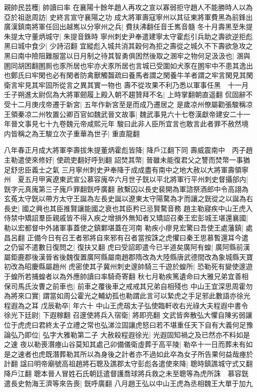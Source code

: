 親帥民芸穫|{
	帥讀曰率}
在襄陽十餘年趙人再攻之宣以寡弱拒守趙人不能勝時人以為亞於祖逖周訪|{
	史終言宣守襄陽之功}
成大將軍壽寇寧州以其征東將軍費黑為前鋒出廣漢鎮南將軍任回出越嶲以分寧州之兵|{
	費扶沸翻任音壬嶲音髓}
冬十月壽黑至朱提朱提太守董炳城守|{
	朱提音銖時}
寧州刺史尹奉遣建寧太守霍彪引兵助之壽欲逆拒彪黑曰城中食少|{
	少詩沼翻}
宜縱彪入城共消其穀何為拒之壽從之城久不下壽欲急攻之黑曰南中險阻難服當以日月制之待其智勇俱困然後取之溷牢之物何足汲汲也|{
	溷與圂同胡困翻圂厠也豕所居也牢亦犬豕所居也言城已受圍如犬豕在圂牢中不患其逸出也鄭氏曰牢閑也必有閑者防禽獸觸齧疏曰養馬者謂之閑養牛羊者謂之牢言閑見其閑衛言牢見其牢固所從言之異其實一物也}
壽不從攻果不利乃悉以軍事任黑　十一月壬子朔進太尉侃為大將軍劒履上殿入朝不趨贊拜不名|{
	上時掌翻朝直遥翻}
侃固辭不受十二月庚戌帝遷于新宮|{
	五年作新宮至是而成乃遷居之}
是歲凉州僚屬勸張駿稱凉王領秦凉二州牧置公卿百官如魏武晉文故事|{
	魏武事見六十七卷漢獻帝建安二十一年晉文事見七十九卷魏元帝咸熙元年}
駿曰此非人臣所宜言也敢言此者罪不赦然境内皆稱之為王駿立次子重華為世子|{
	重直龍翻}


八年春正月成大將軍李壽拔朱提董炳霍彪皆降|{
	降戶江翻下同}
壽威震南中　丙子趙主勒遣使來修好|{
	使疏吏翻好呼到翻}
詔焚其幣|{
	晉雖未能復君父之讐而焚幣一事猶足舒忠臣義士之氣}
三月寧州刺史尹奉降于成成盡有南中之地大赦以大將軍壽領寧州　夏五月甲寅遼東武宣公慕容廆卒六月世子皝以平北將軍行平州刺史督攝部内|{
	皝字元真廆第三子廆戶罪翻皝呼廣翻}
赦繫囚以長史裴開為軍諮祭酒郎中令高詡為玄菟太守皝以帶方太守王誕為左長史誕以遼東太守陽騖為才而讓之皝從之以誕為右長史|{
	國之興也其臣推賢讓能國之衰也其臣矜已忌賢騖音務}
趙主勒寢疾中山王虎入侍禁中矯詔羣臣親戚皆不得入疾之增損外無知者又矯詔召秦王宏彭城王堪還襄國|{
	勒以宏都督中外諸軍事蓋使之鎮鄴堪蓋在河南}
勒疾小瘳見宏驚曰吾使王處藩鎮|{
	處昌呂翻}
正備今日有召王者邪將自來邪有召者當按誅之虎懼曰秦王思慕暫還耳今遣之仍留不遣數日復問之|{
	復扶又翻}
虎曰受詔即遣今已半道矣廣阿有蝗|{
	廣阿縣前漢屬鉅鹿郡後漢晉省後魏復置廣阿縣屬南趙郡隋改為大陸縣唐武德間改為象城縣天寶初改為昭慶縣屬趙州}
虎密使其子冀州刺史邃帥騎三千遊於蝗所|{
	恐勒死有變使邃遊于蝗所若捕蝗者以為外應帥讀曰率騎奇寄翻}
秋七月勒疾篤遺命曰大雅兄弟宜善相保司馬氏汝曹之前車也|{
	前車之覆後車之戒戒其兄弟自相殘也}
中山王宜深思周霍勿為將來口實|{
	謂當如周公霍光之輔幼孤也勒謂此言可以縶虎之手足邪此數語亦徐光程遐為之耳}
戊辰勒卒|{
	年六十}
中山王虎刼太子弘使臨軒收右光祿大夫程遐中書令徐光下廷尉|{
	下遐稼翻}
召邃使將兵入宿衛|{
	將即亮翻}
文武皆奔散弘大懼自陳劣弱讓位于虎虎曰君終太子立禮之常也弘涕泣固讓虎怒曰若不堪重任天下自有大義何足豫論弘乃即位|{
	弘字大雅勒第二子}
大赦殺程遐徐光|{
	光遐固知禍之及已然亦不料如是之速}
夜以勒喪潛瘞山谷莫知其處己卯備儀衛虛葬于高平陵|{
	勒卒十一日而葬未有如是之速者也虎既潛葬勒其所以為身後之計者亦不過如此卒為女子所告果何益哉瘞於計翻}
諡曰明帝廟號高祖趙將石聰及譙郡太守彭彪各遣使來降|{
	聰時鎮譙城守式又翻降戶江翻}
聰本晉人冒姓石氏朝廷遣督護喬球將兵救之未至聰等為虎所誅　慕容皝遣長史勃海王濟等來告喪|{
	皝呼廣翻}
八月趙王弘以中山王虎為丞相魏王大單于加九

